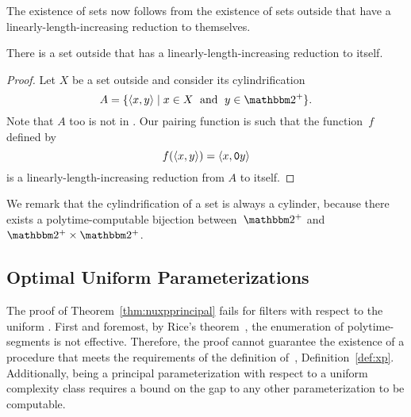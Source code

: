 The existence of  sets now follows from the existence of sets outside  that have a linearly-length-increasing reduction to themselves.
\begin{lemma}
  There is a set outside  that has a linearly-length-increasing reduction to itself.
\end{lemma}
\begin{proof}
  Let $X$ be a set outside  and consider its cylindrification \parencite[see][Section~5.3]{balcazar1990structural}
  \begin{equation*}
    A \deq \{\pair{x}{y} \st x \in X \reland y \in \binary^+\}.
  \end{equation*}
  Note that $A$ too is not in .
  Our pairing function is such that the function~$f$ defined by
  \begin{equation*}
    f({\langle x, y\rangle}) = {\langle x, \textnormal{\texttt{0}}y\rangle}
  \end{equation*}
  is a linearly-length-increasing reduction from $A$ to itself.
\end{proof}

We remark that the cylindrification of a set is always a \pdash{}cylinder, because there exists a polytime-computable bijection between~$\binary^+$ and~$\binary^+ \times \binary^+$.

\subsection{Optimal Uniform Parameterizations}
\label{sec:tractability:optimal}%
The proof of Theorem~\ref{thm:nuxpprincipal} fails for filters with respect to the uniform .
First and foremost, by Rice's theorem~\parencite{rice1953classes}, the enumeration of polytime-segments is not effective.
Therefore, the proof cannot guarantee the existence of a procedure that meets the requirements of the definition of~, Definition~\ref{def:xp}.
Additionally, being a principal parameterization with respect to a uniform complexity class requires a bound on the gap to any other parameterization to be computable.

